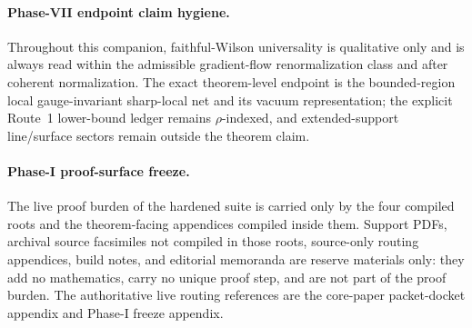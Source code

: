\documentclass[preprint,aip,jmp,amsmath,amssymb,nofootinbib]{revtex4-2}
\begin{document}
\paragraph{Phase-VII endpoint claim hygiene.}
Throughout this companion, faithful-Wilson universality is qualitative only and is always read within the admissible gradient-flow renormalization class and after coherent normalization. The exact theorem-level endpoint is the bounded-region local gauge-invariant sharp-local net and its vacuum representation; the explicit Route~1 lower-bound ledger remains $\rho$-indexed, and extended-support line/surface sectors remain outside the theorem claim.


\paragraph{Phase-I proof-surface freeze.}
The live proof burden of the hardened suite is carried only by the four compiled roots and the theorem-facing appendices compiled inside them. Support PDFs, archival source facsimiles not compiled in those roots, source-only routing appendices, build notes, and editorial memoranda are reserve materials only: they add no mathematics, carry no unique proof step, and are not part of the proof burden. The authoritative live routing references are the core-paper packet-docket appendix and Phase-I freeze appendix.
\end{document}
